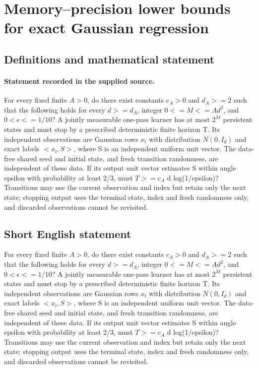\documentclass[11pt]{article}
\begin{document}
\section*{Memory–precision lower bounds for exact Gaussian regression}\label{statement}
\subsection{Definitions and mathematical statement}
\paragraph{Statement recorded in the supplied source.}
For every fixed finite $A>0$, do there exist constants $c_A>0$ and $d_A>=2$ such that the following holds for every $d>=d_A$, integer $0<=M<=Ad^2$, and $0<\epsilon <=1/10$? A jointly measurable one-pass learner has at most $2^M$ persistent states and must stop by a prescribed deterministic finite horizon T. Its independent observations are Gaussian rows $x_t$ with distribution $N(0,I_d)$ and exact labels $<x_t,S>$, where S is an independent uniform unit vector. The data-free shared seed and initial state, and fresh transition randomness, are independent of these data. If its output unit vector estimates S within angle epsilon with probability at least 2/3, must $T>=c_A$ d log(1/epsilon)? Transitions may use the current observation and index but retain only the next state; stopping output uses the terminal state, index and fresh randomness only, and discarded observations cannot be revisited.
\subsection{Short English statement}
For every fixed finite $A>0$, do there exist constants $c_A>0$ and $d_A>=2$ such that the following holds for every $d>=d_A$, integer $0<=M<=Ad^2$, and $0<\epsilon <=1/10$? A jointly measurable one-pass learner has at most $2^M$ persistent states and must stop by a prescribed deterministic finite horizon T. Its independent observations are Gaussian rows $x_t$ with distribution $N(0,I_d)$ and exact labels $<x_t,S>$, where S is an independent uniform unit vector. The data-free shared seed and initial state, and fresh transition randomness, are independent of these data. If its output unit vector estimates S within angle epsilon with probability at least 2/3, must $T>=c_A$ d log(1/epsilon)? Transitions may use the current observation and index but retain only the next state; stopping output uses the terminal state, index and fresh randomness only, and discarded observations cannot be revisited.
\end{document}
